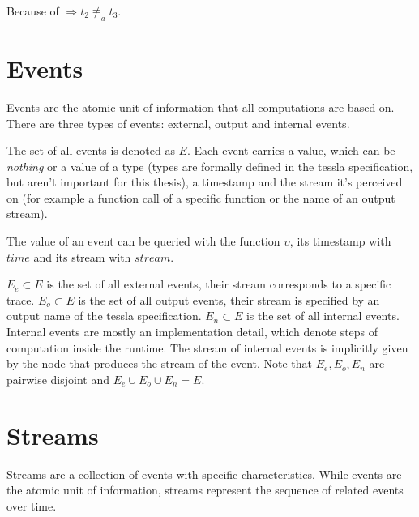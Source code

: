 \begin{exmp}[name=Observational Equivalence]
  Because of  \(\Rightarrow t_2 \not\equiv_a t_3\).

\end{exmp}


\section{Events}
\label{sec:definitions:events}

Events are the atomic unit of information that all computations are based on.
There are three types of events: external, output and internal events.

The set of all events is denoted as \(E\).
Each event carries a value, which can be \emph{nothing} or a value of a type (types are formally defined in the \gls{tessla} specification, but aren't important for this thesis), a timestamp and the stream it's perceived on (for example a function call of a specific function or the name of an output stream).

The value of an event can be queried with the function \(\upsilon\), its timestamp with \(\mathit{time}\) and its stream with \(\mathit{stream}\).

\(E_e \subset E\) is the set of all external events, their stream corresponds to a specific trace.
\(E_o \subset E\) is the set of all output events, their stream is specified by an output name of the \gls{tessla} specification.
\(E_n \subset E\) is the set of all internal events.
Internal events are mostly an implementation detail, which denote steps of computation inside the runtime.
The stream of internal events is implicitly given by the node that produces the stream of the event.
Note that \(E_e, E_o, E_n\) are pairwise disjoint and \(E_e \cup E_o \cup E_n = E\).

\section{Streams}
\label{sec:definitions:streams}

Streams are a collection of events with specific characteristics.
While events are the atomic unit of information, streams represent the sequence of related events over time.

